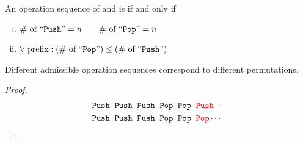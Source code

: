 \begin{frame}{}
  \begin{definition}
    An operation sequence of  and  is  if and only if
    \begin{enumerate}[(i)]
      \pause
      \item $\# \text{ of ``\texttt{Push}''} = n \qquad \# \text{ of ``\texttt{Pop}''} = n$
      \pause
      \item $\forall \text{ prefix}: (\# \text{ of ``\texttt{Pop}''}) \le (\# \text{ of ``\texttt{Push}''})$
    \end{enumerate}
  \end{definition}

  \vspace{0.50cm}
  \pause
  \centerline{}

  \pause
\end{frame}

\begin{frame}{}
  \begin{theorem}
    Different admissible operation sequences correspond to different permutations.
  \end{theorem}

  \vspace{0.30cm}
  \pause
  \begin{proof}
    \begin{align*}
      &\texttt{Push}{}\; \;\texttt{Push}{}\; \;\texttt{Push}{}\; \;\texttt{Pop}{}\; \;\texttt{Pop}{}\; \;\textcolor{red}{\texttt{Push}{}} \cdots \\
      &\texttt{Push}{}\; \;\texttt{Push}{}\; \;\texttt{Push}{}\; \;\texttt{Pop}{}\; \;\texttt{Pop}{}\; \;\textcolor{red}{\texttt{Pop}{}} \cdots \\
    \end{align*}
  \end{proof}
\end{frame}

